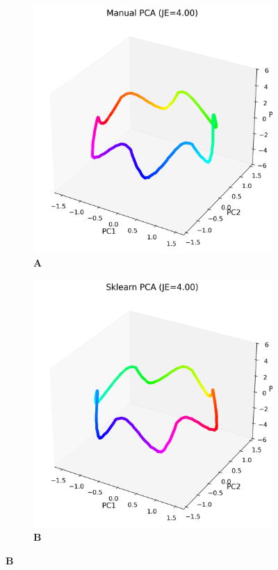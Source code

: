 \documentclass[11pt,a4paper]{article}
\begin{document}
\begin{figure}[H]
\centering
\begin{subfigure}{0.45\textwidth}
    \centering
    \caption*{\textbf{A}}
    \includegraphics[width=\textwidth]{manual_pca.png}
\end{subfigure}
\hfill
\begin{subfigure}{0.45\textwidth}
    \centering
    \caption*{\textbf{B}}
    \includegraphics[width=\textwidth]{sklearn_pca.png}

\end{subfigure}
\end{figure}
\end{document}
